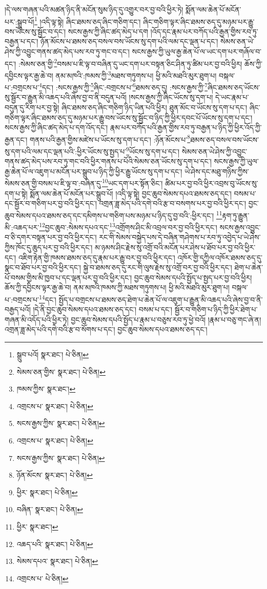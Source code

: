 །དེ་ལས་གཞན་པའི་མཚན་ཉིད་ནི་མངོན་སུམ་ཉིད་དུ་འགྱུར་བར་བྱ་བའི་ཕྱིར་ཏེ། སྨོན་ལམ་ཆེན་པོ་མངོན་པར་:སྒྲུབ་པོ།\footnote{སྒྲུབ་པའོ།  སྣར་ཐང་།  པེ་ཅིན། } །འདི་ལྟ་སྟེ། ཞིང་ཐམས་ཅད་ཞིང་གཅིག་དང་། ཞིང་གཅིག་ལྟར་ཞིང་ཐམས་ཅད་དུ་མཉམ་པར་རྒྱུ་བས་ཡོངས་སུ་སྦྱོང་བ་དང་། སངས་རྒྱས་ཀྱི་ཞིང་ཚད་མེད་པ་དག །འོད་དང་རྣམ་པར་བཀོད་པའི་རྒྱན་གྱིས་རབ་ཏུ་བརྒྱན་པ་དང་། ཉོན་མོངས་པ་ཐམས་ཅད་བསལ་བས་ཡོངས་སུ་དག་པའི་ལམ་དང་ལྡན་པ་དང་། སེམས་ཅན་ཡེ་ཤེས་ཀྱི་འབྱུང་གནས་ཚད་མེད་པས་རབ་ཏུ་གང་བ་དང་། སངས་རྒྱས་ཀྱི་ཡུལ་རྒྱ་ཆེན་པོ་ལ་ཡང་དག་པར་གཞོལ་བ་དང་། :སེམས་ཅན་གྱི་\footnote{སེམས་ཅན་གྱིས་  སྣར་ཐང་།  པེ་ཅིན། }བསམ་པ་ཇི་ལྟ་བ་བཞིན་དུ་ཡང་དག་པར་བསྟན་ཅིང་ཤིན་ཏུ་ཚིམ་པར་བྱ་བའི་ཕྱིར། ཆོས་ཀྱི་དབྱིངས་ལྟར་རྒྱ་ཆེ་བ། ནམ་མཁའི་:ཁམས་ཀྱི་\footnote{ཁམས་ཀྱིས་  སྣར་ཐང་། }མཐས་གཏུགས་པ། ཕྱི་མའི་མཐའི་མུར་ཐུག་པ། བསྐལ་པ་:བགྲངས་པ་\footnote{འགྲངས་པ་  སྣར་ཐང་།  པེ་ཅིན། }དང་། :སངས་རྒྱས་ཀྱི་\footnote{སངས་རྒྱས་ཀྱིས་  སྣར་ཐང་།  པེ་ཅིན། }ཞིང་:བགྲངས་པ་\footnote{འགྲངས་པ་  སྣར་ཐང་།  པེ་ཅིན། }ཐམས་ཅད་དུ། :སངས་རྒྱས་ཀྱི་\footnote{སངས་རྒྱས་ཀྱིས་  སྣར་ཐང་།  པེ་ཅིན། }ཞིང་ཐམས་ཅད་ཡོངས་སུ་སྦྱོར་བ་རྒྱུན་མི་འཆད་པའི་ཞེས་བྱ་བ་ནི་བདུན་པའོ། །སངས་རྒྱས་ཀྱི་ཞིང་ཡོངས་སུ་དག་པ། དེ་ཡང་རྣམ་པ་བདུན་དུ་རིག་པར་བྱ་སྟེ། ཞིང་ཐམས་ཅད་ཞིང་གཅིག་ཉིད་ཡིན་པའི་ཕྱིར། ཐུན་མོང་བ་ཡོངས་སུ་དག་པ་དང་། ཞིང་གཅིག་ལྟར་ཞིང་ཐམས་ཅད་དུ་མཉམ་པར་རྒྱུ་བས་ཡོངས་སུ་སྦྱོང་བ་ཉིད་ཀྱི་ཕྱིར་དབང་པོ་ཡོངས་སུ་དག་པ་དང་། སངས་རྒྱས་ཀྱི་ཞིང་ཚད་མེད་པ་དག་འོད་དང་། རྣམ་པར་བཀོད་པའི་རྒྱན་གྱིས་རབ་ཏུ་བརྒྱན་པ་ཉིད་ཀྱི་ཕྱིར་འོད་ཀྱི་རྒྱན་དང་། གནས་པའི་རྒྱན་གྱིས་མཛེས་པ་ཡོངས་སུ་དག་པ་དང་། :ཉོན་མོངས་པ་\footnote{ཉོན་མོངས་  སྣར་ཐང་།  པེ་ཅིན། }ཐམས་ཅད་བསལ་བས་ཡོངས་སུ་དག་པའི་ལམ་དང་ལྡན་པའི་:ཕྱིར་ཡོངས་སུ་སྤྱད་པ་\footnote{ཕྱིར་  སྣར་ཐང་།  པེ་ཅིན། }ཡོངས་སུ་དག་པ་དང་། སེམས་ཅན་ཡེ་ཤེས་ཀྱི་འབྱུང་གནས་ཚད་མེད་པས་རབ་ཏུ་གང་བའི་ཕྱིར་གནས་པ་པོའི་སེམས་ཅན་ཡོངས་སུ་དག་པ་དང་། སངས་རྒྱས་ཀྱི་ཡུལ་རྒྱ་ཆེན་པོ་ལ་འཇུག་པ་མངོན་པར་སྒྲུབ་པ་ཉིད་ཀྱི་ཕྱིར་རྒྱུ་ཡོངས་སུ་དག་པ་དང་། ཡེ་ཤེས་དང་མཐུ་གཉིས་ཀྱིས་སེམས་ཅན་གྱི་བསམ་པ་ཇི་ལྟ་བ་:བཞིན་དུ་\footnote{བཞིན་  སྣར་ཐང་།  པེ་ཅིན། }ཡང་དག་པར་སྟོན་ཅིང་། ཚིམ་པར་བྱ་བའི་ཕྱིར་འབྲས་བུ་ཡོངས་སུ་དག་པ་སྟེ། སྨོན་ལམ་ཆེན་པོ་མངོན་པར་སྒྲུབ་པོ། །འདི་ལྟ་སྟེ། བྱང་ཆུབ་སེམས་དཔའ་ཐམས་ཅད་དང་། བསམ་པ་དང་སྦྱོར་བ་གཅིག་པར་བྱ་བའི་ཕྱིར་དང་། འགྲན་ཟླ་མེད་པའི་དགེ་བའི་རྩ་བ་བསགས་པར་བྱ་བའི་ཕྱིར་དང་། བྱང་ཆུབ་སེམས་དཔའ་ཐམས་ཅད་དང་དམིགས་པ་གཅིག་པས་མཉམ་པ་ཉིད་དུ་བྱ་བའི་:ཕྱིར་དང་། \footnote{ཕྱིར་  སྣར་ཐང་། }རྟག་ཏུ་རྒྱུན་མི་:འཆད་པར་\footnote{འཆད་པའི་  སྣར་ཐང་།  པེ་ཅིན། }བྱང་ཆུབ་:སེམས་དཔའ་དང་\footnote{སེམས་དཔའ་  སྣར་ཐང་།  པེ་ཅིན། }འགྲོགས་ཤིང་མི་འབྲལ་བར་བྱ་བའི་ཕྱིར་དང་། སངས་རྒྱས་འབྱུང་བ་ཅི་དགར་བསྟན་པར་བྱ་བའི་ཕྱིར་དང་། རང་གི་སེམས་བསྐྱེད་པས་དེ་བཞིན་གཤེགས་པ་རབ་ཏུ་འབྱེད་པ་ཡེ་ཤེས་ཀྱིས་ཁོང་དུ་ཆུད་པར་བྱ་བའི་ཕྱིར་དང་། མ་ཉམས་ཤིང་རྗེས་སུ་འགྲོ་བའི་མངོན་པར་ཤེས་པ་ཐོབ་པར་བྱ་བའི་ཕྱིར་དང་། འཇིག་རྟེན་གྱི་ཁམས་ཐམས་ཅད་དུ་རྣམ་པར་རྒྱུ་བར་བྱ་བའི་ཕྱིར་དང་། འཁོར་གྱི་དཀྱིལ་འཁོར་ཐམས་ཅད་དུ་སྣང་བ་ཐོབ་པར་བྱ་བའི་ཕྱིར་དང་། སྐྱེ་བ་ཐམས་ཅད་དུ་རང་གི་ལུས་རྗེས་སུ་འགྲོ་བར་བྱ་བའི་ཕྱིར་དང་། ཐེག་པ་ཆེན་པོ་བསམ་གྱིས་མི་ཁྱབ་པ་དང་ལྡན་པར་བྱ་བའི་ཕྱིར་དང་། བྱང་ཆུབ་སེམས་དཔའི་སྤྱོད་པ་སྤྱད་པར་བྱ་བའི་ཕྱིར། ཆོས་ཀྱི་དབྱིངས་ལྟར་རྒྱ་ཆེ་བ། ནམ་མཁའི་ཁམས་ཀྱི་མཐས་གཏུགས་པ། ཕྱི་མའི་མཐའི་མུར་ཐུག་པ། བསྐལ་པ་:བགྲངས་པ་\footnote{འགྲངས་པ་  པེ་ཅིན། }དང་། སྤྱོད་པ་བགྲངས་པ་ཐམས་ཅད་ཐེག་པ་ཆེན་པོ་ལ་འཇུག་པ་རྒྱུན་མི་འཆད་པའི་ཞེས་བྱ་བ་ནི་བརྒྱད་པའོ། །དེ་ནི་བྱང་ཆུབ་སེམས་དཔའ་ཐམས་ཅད་དང་། བསམ་པ་དང་། སྦྱོར་བ་གཅིག་པ་ཉིད་ཀྱི་ཕྱིར་ཐེག་པ་གཞན་མི་འདོད་པའི་ཕྱིར་ཏེ། བྱང་ཆུབ་སེམས་དཔའི་སྤྱོད་པ་རྣམ་པ་བཅུས་རབ་ཏུ་ཕྱེ་བའོ། །རྣམ་པ་བཅུ་གང་ཞེ་ན། འགྲན་ཟླ་མེད་པའི་དགེ་བའི་རྩ་བ་སོགས་པ་དང་། བྱང་ཆུབ་སེམས་དཔའ་ཐམས་ཅད་དང་། 